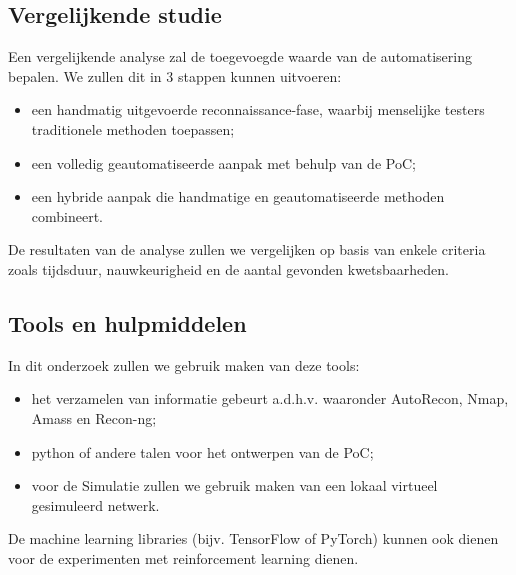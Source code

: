 



\subsection{Vergelijkende studie}

Een vergelijkende analyse zal de toegevoegde waarde van de automatisering bepalen. We zullen dit in 3 stappen kunnen uitvoeren:

\begin{itemize}
    \item een handmatig uitgevoerde reconnaissance-fase, waarbij menselijke testers traditionele methoden toepassen;
    \item een volledig geautomatiseerde aanpak met behulp van de PoC;
    \item een hybride aanpak die handmatige en geautomatiseerde methoden combineert.
\end{itemize}

De resultaten van de analyse zullen we vergelijken op basis van enkele criteria zoals tijdsduur, nauwkeurigheid en de aantal gevonden kwetsbaarheden.

\subsection{Tools en hulpmiddelen}

In dit onderzoek zullen we gebruik maken van deze tools: 

\begin{itemize}
    \item het verzamelen van informatie gebeurt a.d.h.v. waaronder AutoRecon, Nmap, Amass en Recon-ng;
    \item python of andere talen voor het ontwerpen van de PoC;
    \item voor de Simulatie zullen we gebruik maken van een lokaal virtueel gesimuleerd netwerk.
\end{itemize}

De machine learning libraries (bijv. TensorFlow of PyTorch) kunnen ook dienen voor de experimenten met reinforcement learning dienen.

